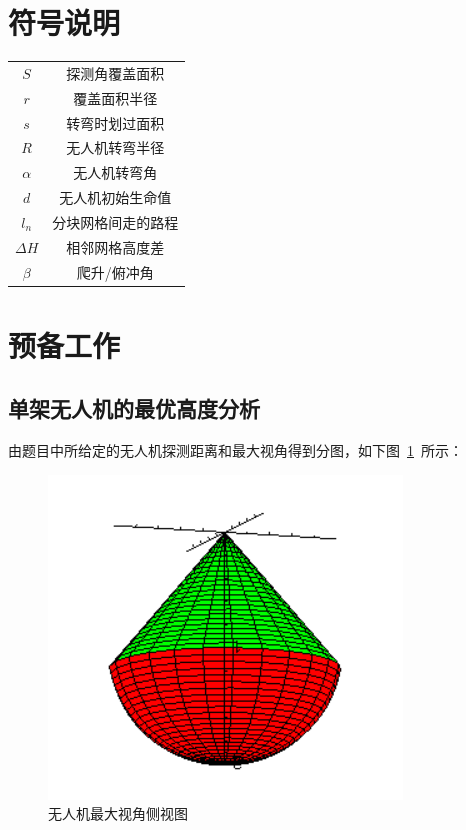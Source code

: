 \documentclass{whutmod}
\begin{document}
	\section{符号说明}
	\begin{center}
		\begin{tabular}{cc}
			\hline
			\makebox[0.3\textwidth][c]{符号}	&  \makebox[0.4\textwidth][c]{意义} \\ \hline
			$S$	    &  探测角覆盖面积 \\ \hline
			$r$	    &  覆盖面积半径 \\ \hline
			$s$	    &  转弯时划过面积 \\ \hline
			$R$  &  无人机转弯半径\\ \hline
		$\alpha $   &  无人机转弯角\\ \hline
			$d$	    & 无人机初始生命值  \\ \hline
		    $l_{n}$	& 分块网格间走的路程 \\ \hline
		    $\Delta H$	& 相邻网格高度差 \\ \hline
		    $\beta $ & 爬升/俯冲角\\ \hline
		\end{tabular}
	\end{center}
	\section{预备工作}
	\subsection{单架无人机的最优高度分析}
	
	由题目中所给定的无人机探测距离和最大视角得到分图，如下图~\ref{img}~所示：
	\begin{figure}[H]
		\centering
		\includegraphics[width=.6\textwidth]{figures/1.png}
		\caption{无人机最大视角侧视图}\label{img}
	\end{figure}
\end{document}
